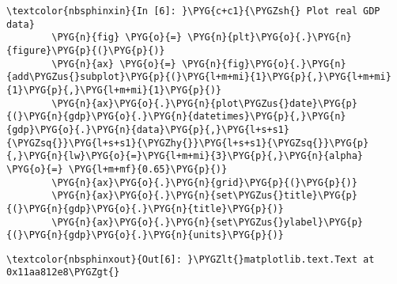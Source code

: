 \documentclass[letterpaper,10pt,openany,oneside,english]{sphinxmanual}
\begin{document}
\begin{Verbatim}[commandchars=\\\{\}]
\textcolor{nbsphinxin}{In [6]: }\PYG{c+c1}{\PYGZsh{} Plot real GDP data}
        \PYG{n}{fig} \PYG{o}{=} \PYG{n}{plt}\PYG{o}{.}\PYG{n}{figure}\PYG{p}{(}\PYG{p}{)}
        \PYG{n}{ax} \PYG{o}{=} \PYG{n}{fig}\PYG{o}{.}\PYG{n}{add\PYGZus{}subplot}\PYG{p}{(}\PYG{l+m+mi}{1}\PYG{p}{,}\PYG{l+m+mi}{1}\PYG{p}{,}\PYG{l+m+mi}{1}\PYG{p}{)}
        \PYG{n}{ax}\PYG{o}{.}\PYG{n}{plot\PYGZus{}date}\PYG{p}{(}\PYG{n}{gdp}\PYG{o}{.}\PYG{n}{datetimes}\PYG{p}{,}\PYG{n}{gdp}\PYG{o}{.}\PYG{n}{data}\PYG{p}{,}\PYG{l+s+s1}{\PYGZsq{}}\PYG{l+s+s1}{\PYGZhy{}}\PYG{l+s+s1}{\PYGZsq{}}\PYG{p}{,}\PYG{n}{lw}\PYG{o}{=}\PYG{l+m+mi}{3}\PYG{p}{,}\PYG{n}{alpha} \PYG{o}{=} \PYG{l+m+mf}{0.65}\PYG{p}{)}
        \PYG{n}{ax}\PYG{o}{.}\PYG{n}{grid}\PYG{p}{(}\PYG{p}{)}
        \PYG{n}{ax}\PYG{o}{.}\PYG{n}{set\PYGZus{}title}\PYG{p}{(}\PYG{n}{gdp}\PYG{o}{.}\PYG{n}{title}\PYG{p}{)}
        \PYG{n}{ax}\PYG{o}{.}\PYG{n}{set\PYGZus{}ylabel}\PYG{p}{(}\PYG{n}{gdp}\PYG{o}{.}\PYG{n}{units}\PYG{p}{)}
\end{Verbatim}

\begin{Verbatim}[commandchars=\\\{\}]
\textcolor{nbsphinxout}{Out[6]: }\PYGZlt{}matplotlib.text.Text at 0x11aa812e8\PYGZgt{}
\end{Verbatim}

\noindent{}
\end{document}
